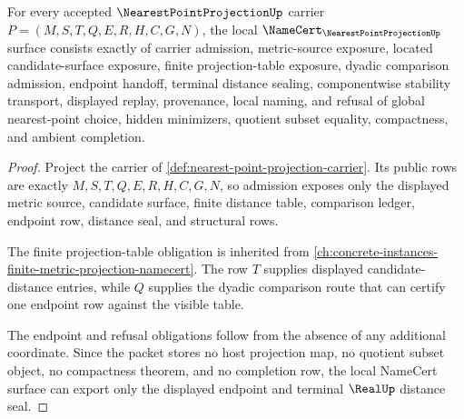 \begin{theorem}
\label{thm:nearest-point-projection-namecert-obligations}
For every accepted $\NearestPointProjectionUp$ carrier $P=(M,S,T,Q,E,R,H,C,G,N)$, the local $\NameCert_{\NearestPointProjectionUp}$ surface consists exactly of carrier admission, metric-source exposure, located candidate-surface exposure, finite projection-table exposure, dyadic comparison admission, endpoint handoff, terminal distance sealing, componentwise stability transport, displayed replay, provenance, local naming, and refusal of global nearest-point choice, hidden minimizers, quotient subset equality, compactness, and ambient completion.
\end{theorem}
\begin{proof}
Project the carrier of \autoref{def:nearest-point-projection-carrier}. Its public rows are exactly $M,S,T,Q,E,R,H,C,G,N$, so admission exposes only the displayed metric source, candidate surface, finite distance table, comparison ledger, endpoint row, distance seal, and structural rows.

The finite projection-table obligation is inherited from \autoref{ch:concrete-instances-finite-metric-projection-namecert}. The row $T$ supplies displayed candidate-distance entries, while $Q$ supplies the dyadic comparison route that can certify one endpoint row against the visible table.

The endpoint and refusal obligations follow from the absence of any additional coordinate. Since the packet stores no host projection map, no quotient subset object, no compactness theorem, and no completion row, the local NameCert surface can export only the displayed endpoint and terminal $\RealUp$ distance seal.
\end{proof}

